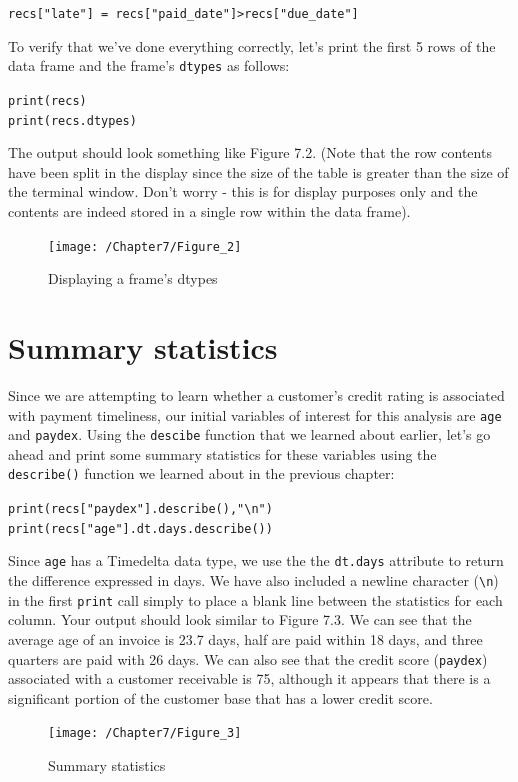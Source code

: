 \documentclass{book}
\begin{document}
\texttt{recs["late"] = recs["paid\_date"]>recs["due\_date"]}

To verify that we've done everything correctly, let's print the first 5 rows of the data frame and the frame's \texttt{dtypes} as follows:

\texttt{print(recs) \\ print(recs.dtypes)}

The output should look something like Figure 7.2. (Note that the row contents have been split in the display since the size of the table is greater than the size of the terminal window. Don't worry - this is for display purposes only and the contents are indeed stored in a single row within the data frame).

\begin{figure}[h]
	\caption{Displaying a frame's dtypes}
	\centering\texttt{[image: /Chapter7/Figure\_2]}
\end{figure}

\section{Summary statistics}

Since we are attempting to learn whether a customer's credit rating is associated with payment timeliness, our initial variables of interest for this analysis are \texttt{age} and \texttt{paydex}. Using the \texttt{descibe} function that we learned about earlier, let's go ahead and print some summary statistics for these variables using the \texttt{describe()} function we learned about in the previous chapter:

\texttt{print(recs["paydex"].describe(),"\textbackslash n") \\print(recs["age"].dt.days.describe())}

Since \texttt{age} has a Timedelta data type, we use the the \texttt{dt.days} attribute to return the difference expressed in days. We have also included a newline character (\texttt{\textbackslash n}) in the first \texttt{print} call simply to place a blank line between the statistics for each column. Your output should look similar to Figure 7.3. We can see that the average age of an invoice is 23.7 days, half are paid within 18 days, and three quarters are paid with 26 days. We can also see that the credit score (\texttt{paydex}) associated with a customer receivable is 75, although it appears that there is a significant portion of the customer base that has a lower credit score.

\begin{figure}[h]
	\caption{Summary statistics}
	\centering\texttt{[image: /Chapter7/Figure\_3]}
\end{figure}
\end{document}
